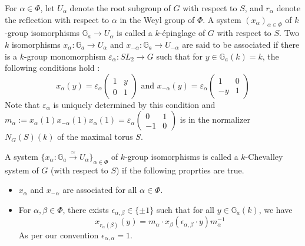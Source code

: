 \documentclass[11 pt]{article}
\numberwithin{equation}{subsection}
\theoremstyle{definition}
\theoremstyle{remark}
\theoremstyle{conjecture}
\newcommand{\G}{\mathbb G}
\begin{document}
For $\alpha \in \Phi$, let $U_\alpha$ denote the root subgroup of $G$ with respect to $S$, and $r_\alpha$ denote the reflection with respect to $\alpha$ in the Weyl group of $\Phi$. A system $(x_\alpha)_{\alpha \in \Phi}$ of $k$-group isomorphisms $\G_a\rightarrow U_\alpha $ is called a $k$-\'epinglage of $G$ with respect to $S$. Two $k$ isomorphisms $x_\alpha:\G_a\rightarrow U_\alpha$
and $x_{-\alpha}: \G_a \rightarrow U_{-\alpha}$ are said to be associated if there is a $k$-group monomorphism $\varepsilon_\alpha : SL_2 \rightarrow G$ such that for $y \in \G_a(k)=k$, the following conditions hold :
\begin{equation*}
    x_\alpha (y)= \varepsilon_\alpha\begin{pmatrix}
        1&y\\
        0&1
    \end{pmatrix} \text{ and } x_{-\alpha}(y)=\varepsilon_\alpha \begin{pmatrix}
        1&0\\
        -y&1
    \end{pmatrix}
\end{equation*}
Note that $\varepsilon_\alpha$ is uniquely determined by this condition and $m_\alpha:= x_\alpha(1)x_{-\alpha}(1)x_\alpha(1)=\varepsilon_\alpha\begin{pmatrix}
        0&1\\
        -1&0
    \end{pmatrix}$ is in the normalizer $N_G(S)(k)$ of the maximal torus $S$. \par
    A system $\{x_\alpha:\G_a \xrightarrow{\simeq} U_\alpha\}_{\alpha\in \Phi}$ of $k$-group isomorphisms is called a $k$-Chevalley system of $G$ (with respect to $S$) if the following proprties are true.
    \begin{itemize}
        \item $x_\alpha$ and $x_{-\alpha}$ are associated for all $\alpha \in \Phi$. 
        \item For $\alpha ,\beta \in \Phi$, there exists $\epsilon_{\alpha ,\beta}\in \{\pm1\}$ such that for all $y \in \G_a(k)$, we have 
        \begin{equation*}
            x_{r_\alpha(\beta)}(y)=m_\alpha \cdot x_\beta(\epsilon_{\alpha,\beta}\cdot y)m_\alpha^{-1}
        \end{equation*}
        As per our convention $\epsilon_{\alpha,\alpha}=1$. 
    \end{itemize}
\end{document}
